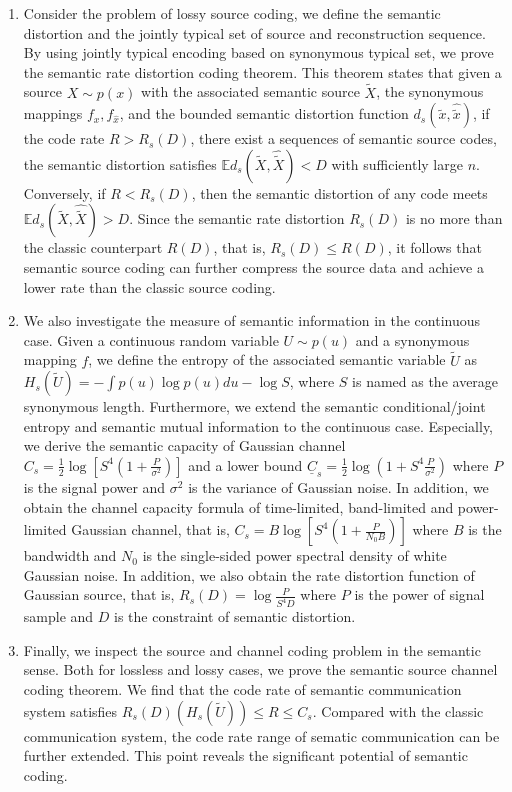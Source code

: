 \documentclass[12pt, draftclsnofoot,onecolumn]{IEEEtran}
\begin{document}
\begin{enumerate}[(1)]
  \item Consider the problem of lossy source coding, we define the semantic distortion and the jointly typical set of source and reconstruction sequence. By using jointly typical encoding based on synonymous typical set, we prove the semantic rate distortion coding theorem. This theorem states that given a source $X\sim p(x)$ with the associated semantic source $\tilde{X}$, the synonymous mappings $f_x,f_{\hat{x}}$, and the bounded semantic distortion function $d_s(\tilde{x},\hat{\tilde{x}})$, if the code rate $R>R_s(D)$, there exist a sequences of semantic source codes, the semantic distortion satisfies $\mathbb{E}d_s(\tilde{X},\hat{\tilde{X}})<D$ with sufficiently large $n$. Conversely, if $R<R_s(D)$, then the semantic distortion of any code meets $\mathbb{E}d_s(\tilde{X},\hat{\tilde{X}})>D$. Since the semantic rate distortion $R_s(D)$ is no more than the classic counterpart $R(D)$, that is, $R_s(D)\leq R(D)$, it follows that semantic source coding can further compress the source data and achieve a lower rate than the classic source coding.

  \item We also investigate the measure of semantic information in the continuous case. Given a continuous random variable $U\sim p(u)$ and a synonymous mapping $f$, we define the entropy of the associated semantic variable $\tilde{U}$ as $H_s(\tilde{U})=-\int p(u)\log p(u)du-\log S$, where $S$ is named as the average synonymous length. Furthermore, we extend the semantic conditional/joint entropy and semantic mutual information to the continuous case. Especially, we derive the semantic capacity of Gaussian channel $C_s=\frac{1}{2}\log \left[S^4\left(1+\frac{P}{\sigma^2}\right)\right]$ and a lower bound $\underline{C}_s=\frac{1}{2}\log\left(1+S^4\frac{P}{\sigma^2}\right)$ where $P$ is the signal power and $\sigma^2$ is the variance of Gaussian noise. In addition, we obtain the channel capacity formula of time-limited, band-limited and power-limited Gaussian channel, that is, $C_s=B\log \left[S^4\left(1+\frac{P}{N_0B}\right)\right]$ where $B$ is the bandwidth and $N_0$ is the single-sided power spectral density of white Gaussian noise. In addition, we also obtain the rate distortion function of Gaussian source, that is, $R_s(D)=\log \frac{P}{S^4D}$ where $P$ is the power of signal sample and $D$ is the constraint of semantic distortion.

  \item Finally, we inspect the source and channel coding problem in the semantic sense. Both for lossless and lossy cases, we prove the semantic source channel coding theorem. We find that the code rate of semantic communication system satisfies $R_s(D) (H_s(\tilde{U})) \leq R\leq C_s$. Compared with the classic communication system, the code rate range of sematic communication can be further extended. This point reveals the significant potential of semantic coding.

\end{enumerate}
\end{document}
